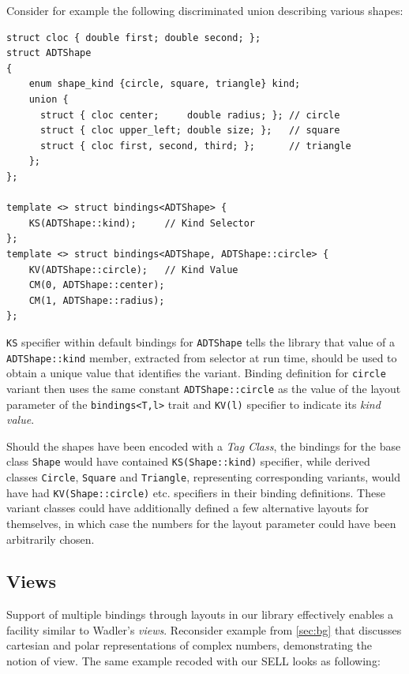 \documentclass[preprint]{sigplanconf}
\makeatletter
\DeclareRobustCommand{\code}[1]{{\lstinline[breaklines=false,escapechar=@]{#1}}}
\makeatother
\begin{document}
Consider for example the following discriminated union describing various 
shapes:

\begin{lstlisting}[keepspaces,columns=flexible]
struct cloc { double first; double second; };
struct ADTShape
{
    enum shape_kind {circle, square, triangle} kind;
    union {
      struct { cloc center;     double radius; }; // circle
      struct { cloc upper_left; double size; };   // square
      struct { cloc first, second, third; };      // triangle
    };
};

template <> struct bindings<ADTShape> { 
    KS(ADTShape::kind);     // Kind Selector
};
template <> struct bindings<ADTShape, ADTShape::circle> {
    KV(ADTShape::circle);   // Kind Value
    CM(0, ADTShape::center);
    CM(1, ADTShape::radius);
};
\end{lstlisting}

\noindent
\code{KS} specifier within default bindings for \code{ADTShape} tells the library 
that value of a \code{ADTShape::kind} member, extracted from selector at run time, 
should be used to obtain a unique value that identifies the variant. Binding 
definition for \code{circle} variant then uses the same constant 
\code{ADTShape::circle} as the value of the layout parameter of the 
\code{bindings<T,l>} trait and \code{KV(l)} specifier to indicate its \emph{kind 
value}.

Should the shapes have been encoded with a \emph{Tag Class}, the bindings for 
the base class \code{Shape} would have contained \code{KS(Shape::kind)} 
specifier, while derived classes \code{Circle}, \code{Square} and 
\code{Triangle}, representing corresponding variants, would have had 
\code{KV(Shape::circle)} etc. specifiers in their binding definitions. These 
variant classes could have additionally defined a few alternative layouts for 
themselves, in which case the numbers for the layout parameter could have been 
arbitrarily chosen.

\subsection{Views}
\label{sec:view}

Support of multiple bindings through layouts in our library effectively enables 
a facility similar to Wadler's \emph{views}. Reconsider example from 
\textsection\ref{sec:bg} that discusses cartesian and polar representations of 
complex numbers, demonstrating the notion of view. The same example recoded with 
our SELL looks as following:
\end{document}
